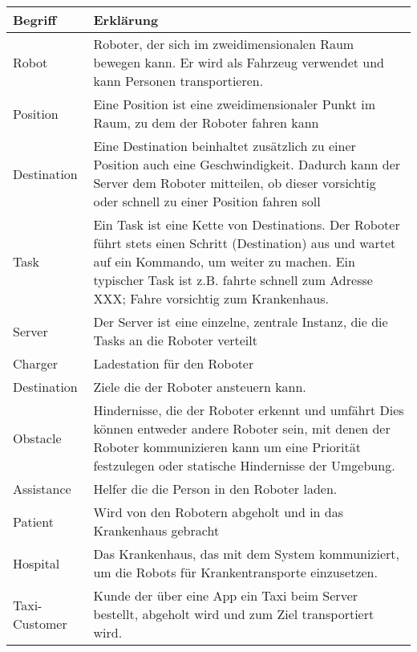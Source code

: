 	\begin{tabularx}{\textwidth}{|l|X|}
		\hline
		\textbf{Begriff} & \textbf{Erklärung}\\ \hline
		Robot & Roboter, der sich im zweidimensionalen Raum bewegen kann. Er wird als Fahrzeug verwendet und kann Personen transportieren.\\ \hline
		Position & Eine Position ist eine zweidimensionaler Punkt im Raum, zu dem der Roboter fahren kann\\ \hline
		Destination & Eine Destination beinhaltet zusätzlich zu einer Position auch eine Geschwindigkeit. Dadurch kann der Server dem Roboter mitteilen, ob
		dieser vorsichtig oder schnell zu einer Position fahren
		soll \\ \hline
		Task & Ein Task ist eine Kette von Destinations. Der Roboter führt stets einen Schritt (Destination) aus und wartet auf ein Kommando, um weiter zu machen. Ein typischer Task ist z.B. fahrte schnell zum Adresse XXX; Fahre vorsichtig zum Krankenhaus.\\ \hline
		Server & Der Server ist eine einzelne, zentrale Instanz, die die Tasks
		an die Roboter verteilt\\ \hline
		Charger & Ladestation für den Roboter\\ \hline
		Destination & Ziele die der Roboter ansteuern kann.\\ \hline
		Obstacle & Hindernisse, die der Roboter erkennt und umfährt Dies können
		entweder andere Roboter sein, mit denen der Roboter kommunizieren kann
		um eine Priorität festzulegen oder statische Hindernisse der
		Umgebung.\\ \hline
		Assistance & Helfer die die Person in den Roboter laden.\\ \hline
		Patient & Wird von den Robotern abgeholt und in das Krankenhaus gebracht\\ \hline
		Hospital & Das Krankenhaus, das mit dem System kommuniziert, um die Robots für Krankentransporte einzusetzen. \\ \hline
		Taxi-Customer & Kunde der über eine App ein Taxi beim Server bestellt, abgeholt wird und zum Ziel transportiert wird.\\ \hline
	\end{tabularx}
